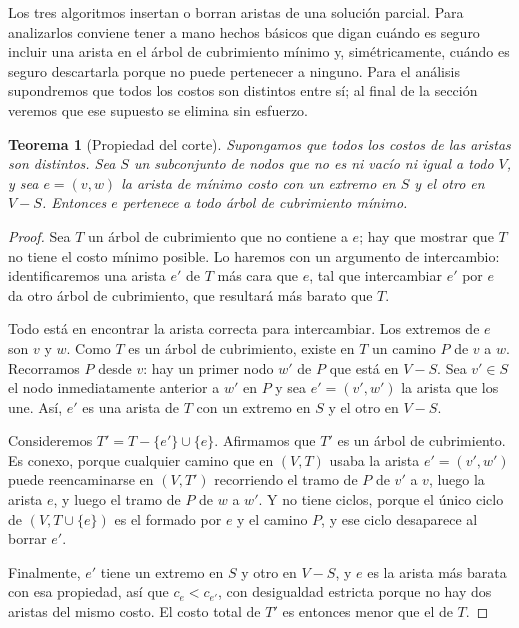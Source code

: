 \documentclass[12pt, spanish, oneside, openany]{book}
\theoremstyle{uprightplain}
\newtheorem{teorema}{Teorema}[section]
\theoremstyle{definition}
\theoremstyle{remark}
\theoremstyle{definition}
\begin{document}
Los tres algoritmos insertan o borran aristas de una solución parcial. Para analizarlos conviene tener a mano hechos básicos que digan cuándo es seguro incluir una arista en el árbol de cubrimiento mínimo y, simétricamente, cuándo es seguro descartarla porque no puede pertenecer a ninguno. Para el análisis supondremos que todos los costos son distintos entre sí; al final de la sección veremos que ese supuesto se elimina sin esfuerzo.

\begin{teorema}[Propiedad del corte]
\label{teo:corte}
Supongamos que todos los costos de las aristas son distintos. Sea $S$ un subconjunto de nodos que no es ni vacío ni igual a todo $V$, y sea $e=(v,w)$ la arista de mínimo costo con un extremo en $S$ y el otro en $V-S$. Entonces $e$ pertenece a todo árbol de cubrimiento mínimo.
\end{teorema}
\begin{proof}
Sea $T$ un árbol de cubrimiento que no contiene a $e$; hay que mostrar que $T$ no tiene el costo mínimo posible. Lo haremos con un argumento de intercambio: identificaremos una arista $e'$ de $T$ más cara que $e$, tal que intercambiar $e'$ por $e$ da otro árbol de cubrimiento, que resultará más barato que $T$.

Todo está en encontrar la arista correcta para intercambiar. Los extremos de $e$ son $v$ y $w$. Como $T$ es un árbol de cubrimiento, existe en $T$ un camino $P$ de $v$ a $w$. Recorramos $P$ desde $v$: hay un primer nodo $w'$ de $P$ que está en $V-S$. Sea $v' \in S$ el nodo inmediatamente anterior a $w'$ en $P$ y sea $e'=(v',w')$ la arista que los une. Así, $e'$ es una arista de $T$ con un extremo en $S$ y el otro en $V-S$.

Consideremos $T'=T-\{e'\}\cup\{e\}$. Afirmamos que $T'$ es un árbol de cubrimiento. Es conexo, porque cualquier camino que en $(V,T)$ usaba la arista $e'=(v',w')$ puede reencaminarse en $(V,T')$ recorriendo el tramo de $P$ de $v'$ a $v$, luego la arista $e$, y luego el tramo de $P$ de $w$ a $w'$. Y no tiene ciclos, porque el único ciclo de $(V,T\cup\{e\})$ es el formado por $e$ y el camino $P$, y ese ciclo desaparece al borrar $e'$.

Finalmente, $e'$ tiene un extremo en $S$ y otro en $V-S$, y $e$ es la arista más barata con esa propiedad, así que $c_e<c_{e'}$, con desigualdad estricta porque no hay dos aristas del mismo costo. El costo total de $T'$ es entonces menor que el de $T$.
\end{proof}
\end{document}
